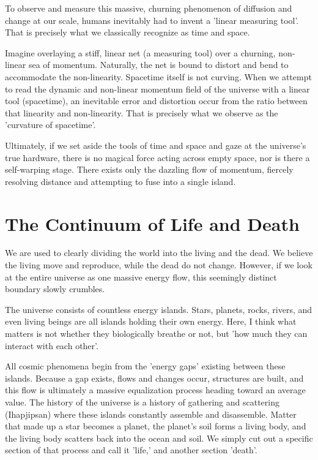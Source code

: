 \documentclass[11pt,a4paper]{article}
\begin{document}
To observe and measure this massive, churning phenomenon of diffusion and change at our scale, humans inevitably had to invent a 'linear measuring tool'. That is precisely what we classically recognize as time and space.

Imagine overlaying a stiff, linear net (a measuring tool) over a churning, non-linear sea of momentum. Naturally, the net is bound to distort and bend to accommodate the non-linearity. Spacetime itself is not curving. When we attempt to read the dynamic and non-linear momentum field of the universe with a linear tool (spacetime), an inevitable error and distortion occur from the ratio between that linearity and non-linearity. That is precisely what we observe as the 'curvature of spacetime'.

Ultimately, if we set aside the tools of time and space and gaze at the universe's true hardware, there is no magical force acting across empty space, nor is there a self-warping stage. There exists only the dazzling flow of momentum, fiercely resolving distance and attempting to fuse into a single island.

\section*{The Continuum of Life and Death}
We are used to clearly dividing the world into the living and the dead. We believe the living move and reproduce, while the dead do not change. However, if we look at the entire universe as one massive energy flow, this seemingly distinct boundary slowly crumbles.

The universe consists of countless energy islands. Stars, planets, rocks, rivers, and even living beings are all islands holding their own energy. Here, I think what matters is not whether they biologically breathe or not, but 'how much they can interact with each other'.

All cosmic phenomena begin from the 'energy gaps' existing between these islands. Because a gap exists, flows and changes occur, structures are built, and this flow is ultimately a massive equalization process heading toward an average value. The history of the universe is a history of gathering and scattering (Ihapjipsan) where these islands constantly assemble and disassemble. Matter that made up a star becomes a planet, the planet's soil forms a living body, and the living body scatters back into the ocean and soil. We simply cut out a specific section of that process and call it 'life,' and another section 'death'.
\end{document}
